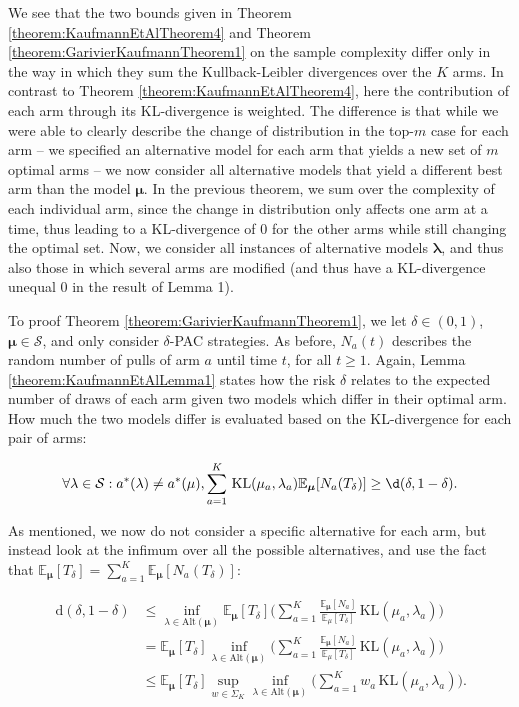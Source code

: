 \documentclass[11pt,]{article}
\newcommand{\KL}{\,\text{KL}}
\newcommand{\der}{\,\text{d}}
\begin{document}
We see that the two bounds given in Theorem
\ref{theorem:KaufmannEtAlTheorem4} and Theorem
\ref{theorem:GarivierKaufmannTheorem1} on the sample complexity differ
only in the way in which they sum the Kullback-Leibler divergences over
the \(K\) arms. In contrast to Theorem
\ref{theorem:KaufmannEtAlTheorem4}, here the contribution of each arm
through its KL-divergence is weighted. The difference is that while we
were able to clearly describe the change of distribution in the
top-\(m\) case for each arm -- we specified an alternative model for
each arm that yields a new set of \(m\) optimal arms -- we now consider
all alternative models that yield a different best arm than the model
\(\bm{\mu}\). In the previous theorem, we sum over the complexity of
each individual arm, since the change in distribution only affects one
arm at a time, thus leading to a KL-divergence of 0 for the other arms
while still changing the optimal set. Now, we consider all instances of
alternative models \(\bm{\lambda}\), and thus also those in which
several arms are modified (and thus have a KL-divergence unequal 0 in
the result of Lemma 1).

To proof Theorem \ref{theorem:GarivierKaufmannTheorem1}, we let
\(\delta \in (0,1)\), \(\bm{\mu} \in \mathcal{S}\), and only consider
\(\delta\)-PAC strategies. As before, \(N_a(t)\) describes the random
number of pulls of arm \(a\) until time \(t\), for all \(t\geq 1\).
Again, Lemma \ref{theorem:KaufmannEtAlLemma1} states how the risk
\(\delta\) relates to the expected number of draws of each arm given two
models which differ in their optimal arm. How much the two models differ
is evaluated based on the KL-divergence for each pair of arms:

\begin{equation*}
\forall \lambda \in \mathcal{S}: a^*(\lambda) \neq a^*(\mu), \sum_{a=1}^K \KL(\mu_a,\lambda_a)\mathbb{E}_{\bm{\mu}}[N_a(T_{\delta})] \geq \d(\delta, 1- \delta).
\end{equation*}

As mentioned, we now do not consider a specific alternative for each
arm, but instead look at the infimum over all the possible alternatives,
and use the fact that
\(\mathbb{E}_{\bm{\mu}}[T_{\delta}] = \sum_{a=1}^K \mathbb{E}_{\bm{\mu}}[N_a(T_{\delta})]\):

\begin{align*}
\der(\delta, 1-\delta) & \leq \inf_{\lambda \in \text{Alt}(\bm{\mu})} \mathbb{E}_{\bm{\mu}}[T_{\delta}] \Big(\sum_{a=1}^K \frac{\mathbb{E}_{\bm{\mu}}[N_a]}{\mathbb{E}_{\mu}[T_{\delta}]} \KL(\mu_a, \lambda_a)\Big) \\
& = \mathbb{E}_{\bm{\mu}}[T_{\delta}] \inf_{\lambda \in \text{Alt}(\bm{\mu})} \Big(\sum_{a=1}^K \frac{\mathbb{E}_{\bm{\mu}}[N_a]}{\mathbb{E}_{\mu}[T_{\delta}]} \KL(\mu_a, \lambda_a)\Big) \\
& \leq \mathbb{E}_{\bm{\mu}}[T_{\delta}] \sup_{w \in \Sigma_K} \inf_{\lambda \in \text{Alt}(\bm{\mu})} \Big(\sum_{a=1}^K w_a \KL(\mu_a, \lambda_a)\Big).
\end{align*}
\end{document}
